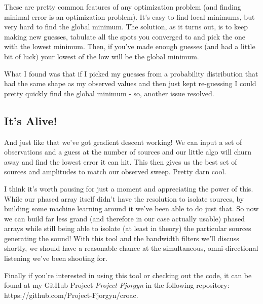 \documentclass[10pt,a4paper]{article}
\begin{document}
These are pretty common features of any optimization problem (and finding minimal error is an optimization problem). It's easy to find local minimums, but very hard to find the global minimum. The solution, as it turns out, is to keep making new guesses, tabulate all the spots you converged to and pick the one with the lowest minimum. Then, if you've made enough guesses (and had a little bit of luck) your lowest of the low will be the global minimum. 

What I found was that if I picked my guesses from a probability distribution that had the same shape as my observed values and then just kept re-guessing I could pretty quickly find the global minimum - so, another issue resolved. 

\subsection{It's Alive!}

And just like that we've got gradient descent working! We can input a set of observations and a guess at the number of sources and our little algo will churn away and find the lowest error it can hit. This then gives us the best set of sources and amplitudes to match our observed sweep. Pretty darn cool. 

I think it's worth pausing for just a moment and appreciating the power of this. While our phased array itself didn't have the resolution to isolate sources, by building some machine learning around it we've been able to do just that. So now we can build far less grand (and therefore in our case actually usable) phased arrays while still being able to isolate (at least in theory) the particular sources generating the sound! With this tool and the bandwidth filters we'll discuss shortly, we should have a reasonable chance at the simultaneous, omni-directional listening we've been shooting for. 

Finally if you're interested in using this tool or checking out the code, it can be found at my GitHub Project \textit{Project Fjorgyn} in the following repository: https://github.com/Project-Fjorgyn/croac.

\newpage



\end{document}
